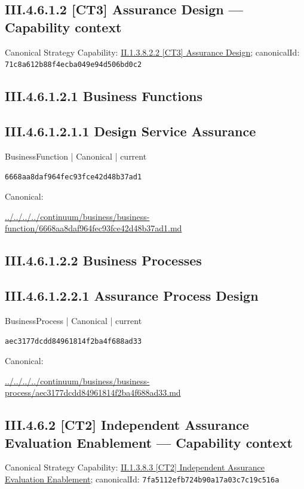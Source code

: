 \documentclass[10pt,a4paper]{article}
\begin{document}
\subsection*{III.4.6.1.2 [CT3] Assurance Design — Capability context}
Canonical Strategy Capability: \hyperref[element-71c8a612b88f4ecba049e94d506bd0c2]{II.1.3.8.2.2 [CT3] Assurance Design}; canonicalId: \texttt{71c8a612b88f4ecba049e94d506bd0c2}\par
\subsection*{III.4.6.1.2.1 Business Functions}
\subsection*{III.4.6.1.2.1.1 Design Service Assurance}
\label{element-6668aa8daf964fec93fce42d48b37ad1}
{\small BusinessFunction | Canonical | current}\par
\texttt{6668aa8daf964fec93fce42d48b37ad1}\par
Canonical: \par
{\footnotesize\url{../../../../continuum/business/business-function/6668aa8daf964fec93fce42d48b37ad1.md}}\par
\subsection*{III.4.6.1.2.2 Business Processes}
\subsection*{III.4.6.1.2.2.1 Assurance Process Design}
\label{element-aec3177dcdd84961814f2ba4f688ad33}
{\small BusinessProcess | Canonical | current}\par
\texttt{aec3177dcdd84961814f2ba4f688ad33}\par
Canonical: \par
{\footnotesize\url{../../../../continuum/business/business-process/aec3177dcdd84961814f2ba4f688ad33.md}}\par
\subsection*{III.4.6.2 [CT2] Independent Assurance Evaluation Enablement — Capability context}
Canonical Strategy Capability: \hyperref[element-7fa5112efb724b90a17a03c7c19c516a]{II.1.3.8.3 [CT2] Independent Assurance Evaluation Enablement}; canonicalId: \texttt{7fa5112efb724b90a17a03c7c19c516a}\par
\end{document}
